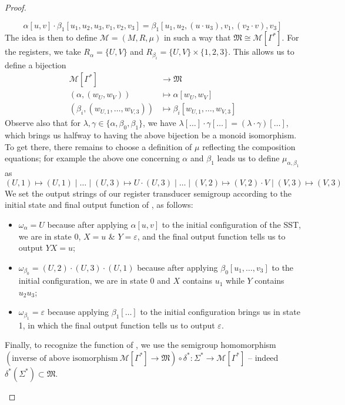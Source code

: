 \documentclass[a4paper,english,cleveref, autoref, thm-restate, numberwithinsect]{lipics-v2021}
\newcommand{\tito}[1]{\todo[inline,color=green!40]{Tito --- #1}}
\begin{document}
\begin{proof}
\begin{claimproof}
    \[ \alpha[u,v] \cdot \beta_1[u_1,u_2,u_3,v_1,v_2,v_3] = \beta_1[u_1,u_2,(u \cdot u_3),v_1,(v_2 \cdot v),v_3] \]
    The idea is then to define $\mathcal{M} = (M,R,\mu)$ in such a way that $\mathfrak{M} \cong \mathcal{M}[\Gamma^*]$. For the registers, we take $R_\alpha = \{U,V\}$ and $R_{\beta_i} = \{U,V\} \times \{1,2,3\}$. This allows us to define a bijection
    \begin{align*}
      \mathcal{M}[\Gamma^*] &\to \mathfrak{M}\\
      (\alpha, (w_{U}, w_{V})) &\mapsto \alpha[w_{U},w_{V}]\\
      (\beta_i, (w_{U,1},\dots,w_{V,3})) &\mapsto \beta_i[w_{U,1},\dots,w_{V,3}]
    \end{align*}
    Observe also that for $\lambda,\gamma\in\{\alpha,\beta_0,\beta_1\}$, we have $\lambda[\dots] \cdot \gamma[\dots] = (\lambda\cdot\gamma)[\dots]$, which brings us halfway to having the above bijection be a monoid isomorphism. To get there, there remains to choose a definition of $\mu$ reflecting the composition equations; for example the above one concerning $\alpha$ and $\beta_1$ leads us to define $\mu_{\alpha,\beta_1}$ as
    \[ (U,1)\mapsto(U,1) \mid \dots \mid (U,3) \mapsto U \cdot (U,3) \mid \dots \mid (V,2) \mapsto (V,2) \cdot V \mid (V,3) \mapsto (V,3) \]
    We set the output strings of our register transducer semigroup according to the initial state and final output function of , as follows:
    \begin{itemize}
      \item $\omega_\alpha = U$ because after applying $\alpha[u,v]$ to the initial configuration of the SST, we are in state 0, $X = u$ \& $Y = \varepsilon$, and the final output function tells us to output $YX = u$;
      \item $\omega_{\beta_0} = (U,2)\cdot(U,3)\cdot(U,1)$ because after applying $\beta_0[u_1,\dots,v_3]$ to the initial configuration, we are in state 0 and $X$ contains $u_1$ while $Y$ contains $u_2 u_3$;
      \item $\omega_{\beta_1} = \varepsilon$ because applying $\beta_1[\dots]$ to the initial configuration brings us in state 1, in which the final output function tells us to output $\varepsilon$.
    \end{itemize}
    Finally, to recognize the function of , we use the semigroup homomorphism $(\text{inverse of above isomorphism}\ \mathcal{M}[\Gamma^*] \to \mathfrak{M}) \circ \delta^* : \Sigma^* \to \mathcal{M}[\Gamma^*]$ -- indeed $\delta^*(\Sigma^*) \subset \mathfrak{M}$.
  \end{claimproof}

  \tito{todo when $f(\varepsilon) \neq \varepsilon$}
\end{proof}
\end{document}
